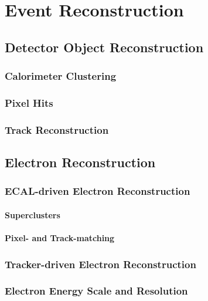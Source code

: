 \chapter{Event Reconstruction}
\section{Detector Object Reconstruction}
\subsection{Calorimeter Clustering}
\subsection{Pixel Hits}
\subsection{Track Reconstruction}
\section{Electron Reconstruction}
\subsection{ECAL-driven Electron Reconstruction}
\subsubsection{Superclusters}
\subsubsection{Pixel- and Track-matching}
\subsection{Tracker-driven Electron Reconstruction}
\subsection{Electron Energy Scale and Resolution}
